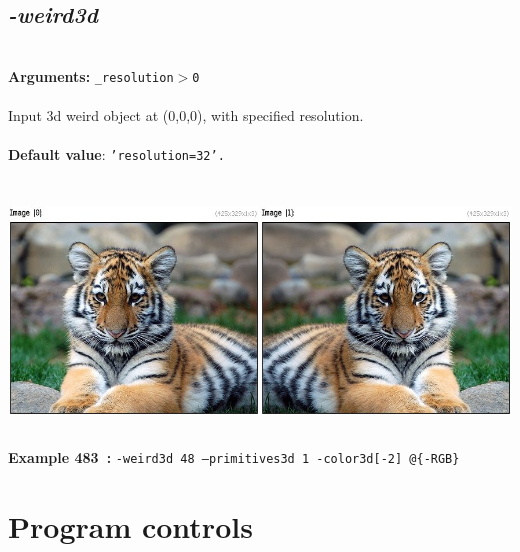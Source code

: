 \documentclass[a4paper,11pt,twoside]{book}
\begin{document}
\subsection{\emph{-weird3d} }\vspace*{-0.5em}
~\\\textbf{Arguments: } 
{\small \texttt{\_resolution$>$0}}\\~\\
Input 3d weird object at (0,0,0), with specified resolution.
~\\~\\\textbf{Default value}: {\small \texttt{'resolution=32'.}}
\begin{center}\includegraphics[keepaspectratio=true,height=7cm,width=\textwidth]{img/gmic_def483.jpg}\\
{\footnotesize \textbf{Example 483~:} \texttt{-weird3d 48 --primitives3d 1 -color3d[-2] @\{-RGB\}}}
\end{center}
\section{Program controls}
\end{document}
